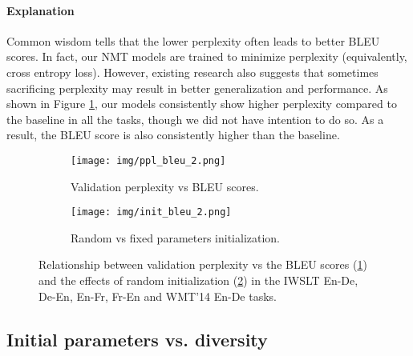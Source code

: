 \documentclass{article}
\begin{document}
\vspace{-0.5em}
\paragraph{Explanation}
Common wisdom tells that the lower perplexity often leads to better BLEU scores. In fact, our NMT models are trained to minimize perplexity (equivalently, cross entropy loss). However, existing research \citep{decoding_nmt} also suggests that sometimes sacrificing perplexity may result in better generalization and performance. As shown in Figure \ref{fig:ppl_vs_bleu}, our models consistently show higher perplexity compared to the baseline in all the tasks, though we did not have intention to do so. As a result, the BLEU score is also consistently higher than the baseline.


\begin{figure}
\vspace{-1em}
\begin{center}
\begin{subfigure}{.49\textwidth}
    \begin{center}
        \texttt{[image: img/ppl\_bleu\_2.png]}
        \caption{Validation perplexity vs BLEU scores.}
        \label{fig:ppl_vs_bleu}
    \end{center}
\end{subfigure}
\begin{subfigure}{.49\textwidth}
  \begin{center}
    \texttt{[image: img/init\_bleu\_2.png]}
\caption{Random vs fixed parameters initialization.}
    \label{fig:init_vs_bleu}
  \end{center}
\end{subfigure}\end{center}
\vspace{-0.5em}
\caption{Relationship between validation perplexity vs the BLEU scores (\ref{fig:ppl_vs_bleu}) and the effects of random initialization (\ref{fig:init_vs_bleu}) in the IWSLT En-De, De-En, En-Fr, Fr-En and WMT'14 En-De tasks.}
\label{fig:ppl_vs_init_bleu}
\vspace{-1em}
\end{figure}



\subsection{Initial parameters vs. diversity}
\end{document}
